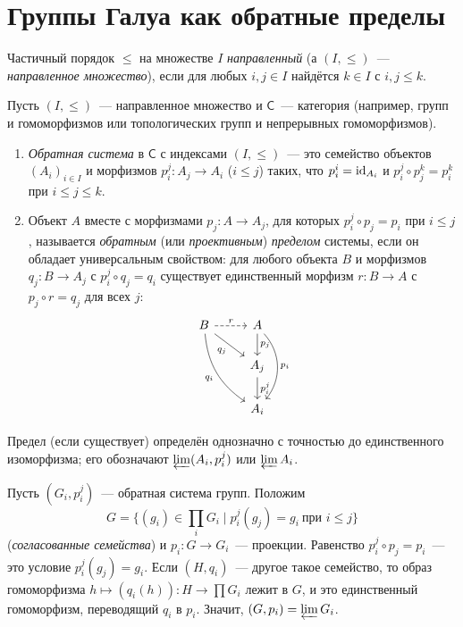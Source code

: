 \section{Группы Галуа как обратные пределы}

\begin{definition}[7.20]
Частичный порядок $\le$ на множестве $I$ \emph{направленный} (а $(I,\le)$~--- \emph{направленное множество}), если для
любых $i,j\in I$ найдётся $k\in I$ с $i,j\le k$.
\end{definition}

\begin{definition}[7.21]
Пусть $(I,\le)$~--- направленное множество и $\mathsf C$~--- категория (например, групп и гомоморфизмов или
топологических групп и непрерывных гомоморфизмов).
\begin{enumerate}[label=(\alph*),leftmargin=*]
\item \emph{Обратная система} в $\mathsf C$ с индексами $(I,\le)$~--- это семейство объектов $(A_i)_{i\in I}$ и морфизмов
$p^j_i\colon A_j\to A_i$ ($i\le j$) таких, что $p^i_i=\operatorname{id}_{A_i}$ и $p^j_i\circ p^k_j=p^k_i$ при $i\le j\le k$.
\item Объект $A$ вместе с морфизмами $p_j\colon A\to A_j$, для которых $p^j_i\circ p_j=p_i$ при $i\le j$, называется
\emph{обратным} (или \emph{проективным}) \emph{пределом} системы, если он обладает универсальным свойством: для любого
объекта $B$ и морфизмов $q_j\colon B\to A_j$ с $p^j_i\circ q_j=q_i$ существует единственный морфизм $r\colon B\to A$
с $p_j\circ r=q_j$ для всех $j$:
\[
\begin{tikzcd}
B\arrow[r,dashed,"r"]\arrow[rd,"q_j"']\arrow[rdd,bend right=25,"q_i"'] & A\arrow[d,"p_j"]\arrow[dd,bend left=40,"p_i"]\\
 & A_j\arrow[d,"p^j_i"]\\
 & A_i
\end{tikzcd}
\]
\end{enumerate}
Предел (если существует) определён однозначно с точностью до единственного изоморфизма; его обозначают
$\varprojlim(A_i,p^j_i)$ или $\varprojlim A_i$.
\end{definition}

\begin{example}[7.22]
Пусть $(G_i,p^j_i)$~--- обратная система групп. Положим
\[
G=\{(g_i)\in\textstyle\prod_iG_i\mid p^j_i(g_j)=g_i\ \text{при }i\le j\}
\]
(\emph{согласованные семейства}) и $p_i\colon G\to G_i$~--- проекции. Равенство $p^j_i\circ p_j=p_i$~--- это условие
$p^j_i(g_j)=g_i$. Если $(H,q_i)$~--- другое такое семейство, то образ гомоморфизма $h\mapsto(q_i(h))\colon
H\to\prod G_i$ лежит в $G$, и это единственный гомоморфизм, переводящий $q_i$ в $p_i$. Значит, $(G,p_i)=\varprojlim G_i$.
\end{example}

